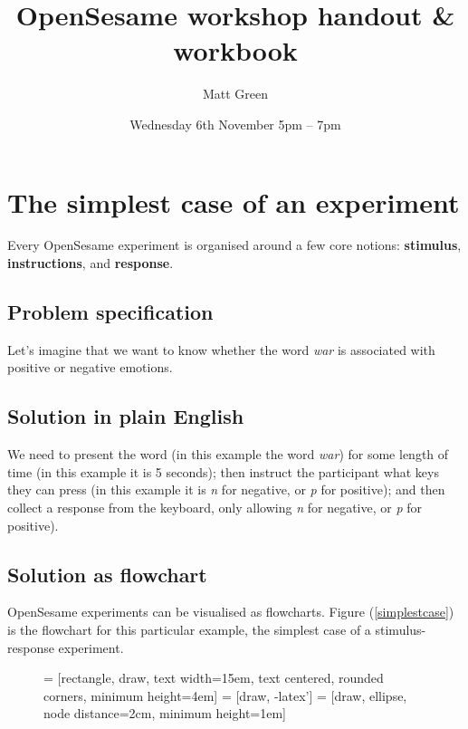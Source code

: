 \documentclass[a4paper]{tufte-handout}
\title{OpenSesame workshop handout \& workbook}
\date{Wednesday 6th November 5pm -- 7pm} %
\author{Matt Green}
\begin{document}

\maketitle
\tableofcontents

\section{The simplest case of an experiment}
Every OpenSesame experiment is organised around a few core notions: \textbf{stimulus}, \textbf{instructions}, and \textbf{response}.

\subsection{Problem specification}
Let's imagine that we want to know whether the word \emph{war} is associated with positive or negative emotions.

\subsection{Solution in plain English}
We need to present the word (in this example the word \emph{war}) for some length of time (in this example it is 5 seconds); then instruct the participant what keys they can press (in this example it is \emph{n} for negative, or \emph{p} for positive); and then collect a response from the keyboard, only allowing \emph{n} for negative, or \emph{p} for positive).

\subsection{Solution as flowchart}
OpenSesame experiments can be visualised as flowcharts. Figure (\ref{simplestcase}) is the flowchart for this particular example, the simplest case of a stimulus-response experiment.
\begin{figure}[!htbp]
\centering
{} = [rectangle, draw, text width=15em, text centered, rounded corners, minimum height=4em]
 = [draw, -latex']
 = [draw, ellipse, node distance=2cm, minimum height=1em]
\end{figure}
\end{document}
